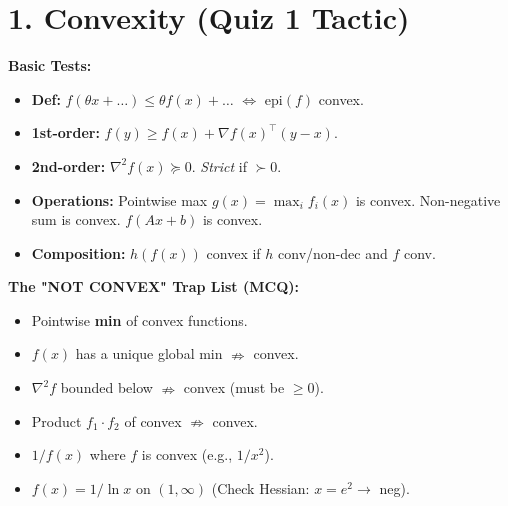 \section{1. Convexity (Quiz 1 Tactic)}
\textbf{Basic Tests:}
\begin{itemize}[leftmargin=*]
  \item \textbf{Def:} $f(\theta x + \dots) \le \theta f(x) + \dots$
    $\iff$ epi$(f)$ convex.
  \item \textbf{1st-order:} $f(y) \ge f(x) + \nabla f(x)^\top(y-x)$.
  \item \textbf{2nd-order:} $\nabla^2 f(x) \succeq 0$.
    \textit{Strict} if $\succ 0$.
  \item \textbf{Operations:} Pointwise max $g(x)=\max_i f_i(x)$ is
    convex. Non-negative sum is convex. $f(Ax+b)$ is convex.
  \item \textbf{Composition:} $h(f(x))$ convex if $h$ conv/non-dec and $f$ conv.
\end{itemize}
\textbf{The "NOT CONVEX" Trap List (MCQ):}
\begin{itemize}[leftmargin=*]
  \item Pointwise \textbf{min} of convex functions.
  \item $f(x)$ has a unique global min $\nRightarrow$ convex.
  \item $\nabla^2 f$ bounded below $\nRightarrow$ convex (must be $\ge 0$).
  \item Product $f_1 \cdot f_2$ of convex $\nRightarrow$ convex.
  \item $1/f(x)$ where $f$ is convex (e.g., $1/x^2$).
  \item $f(x)=1/\ln x$ on $(1, \infty)$ (Check Hessian: $x=e^2 \to$ neg).
\end{itemize}

